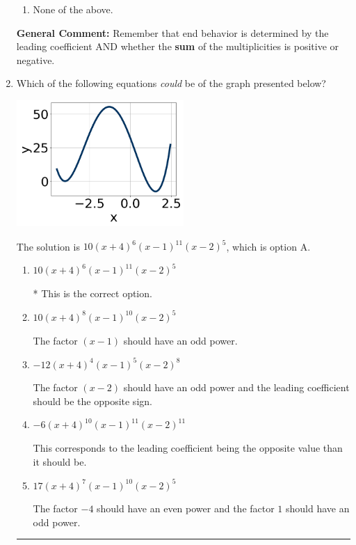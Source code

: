 \documentclass{extbook}[14pt]
\newcommand{\litem}[1]{\item #1

\rule{\textwidth}{0.4pt}}
\begin{document}
\begin{enumerate}
{\begin{enumerate}[label=\Alph*.]
\begin{multicols}{2}
\end{multicols}\item None of the above.\end{enumerate}
\textbf{General Comment:} Remember that end behavior is determined by the leading coefficient AND whether the \textbf{sum} of the multiplicities is positive or negative.
}
\litem{
Which of the following equations \textit{could} be of the graph presented below?

\begin{center}
    \includegraphics[width=0.5\textwidth]{../Figures/polyGraphToFunctionCopyA.png}
\end{center}


The solution is \( 10(x + 4)^{6} (x - 1)^{11} (x - 2)^{5} \), which is option A.\begin{enumerate}[label=\Alph*.]
\item \( 10(x + 4)^{6} (x - 1)^{11} (x - 2)^{5} \)

* This is the correct option.
\item \( 10(x + 4)^{8} (x - 1)^{10} (x - 2)^{5} \)

The factor $(x - 1)$ should have an odd power.
\item \( -12(x + 4)^{4} (x - 1)^{5} (x - 2)^{8} \)

The factor $(x - 2)$ should have an odd power and the leading coefficient should be the opposite sign.
\item \( -6(x + 4)^{10} (x - 1)^{11} (x - 2)^{11} \)

This corresponds to the leading coefficient being the opposite value than it should be.
\item \( 17(x + 4)^{7} (x - 1)^{10} (x - 2)^{5} \)

The factor $-4$ should have an even power and the factor $1$ should have an odd power.
\end{enumerate}

}
\end{enumerate}
\end{document}
